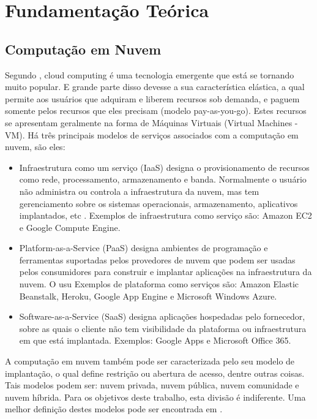\documentclass[twoside,english,brazilian]{UNISINOSmonografia}
\begin{document}

%
%
\chapter{Fundamentação Teórica}

\section{Computação em Nuvem}
Segundo \cite{Lorido-botr2012}, cloud computing é uma tecnologia emergente que está se tornando muito popular. E grande parte disso devesse a sua característica elástica, a qual permite aos usuários que adquiram e liberem recursos sob demanda, e paguem somente pelos recursos que eles precisam (modelo pay-as-you-go). Estes recursos se apresentam geralmente na forma de Máquinas Virtuais (Virtual Machines - VM). Há três principais modelos de serviços associados com a computação em nuvem, são eles:

\begin{itemize}
	\item Infraestrutura como um serviço (IaaS) designa o provisionamento de recursos como rede, processamento, armazenamento e banda. Normalmente o usuário não administra ou controla a infraestrutura da nuvem, mas tem gerenciamento sobre os sistemas operacionais, armazenamento, aplicativos implantados, etc . Exemplos de infraestrutura como serviço são: Amazon EC2 e Google Compute Engine.
	\item Platform-as-a-Service (PaaS) designa ambientes de programação e ferramentas suportadas pelos provedores de nuvem que podem ser usadas pelos consumidores para construir e implantar aplicações na infraestrutura da nuvem. O usu Exemplos de plataforma como serviços são: Amazon Elastic Beanstalk, Heroku, Google App Engine e Microsoft Windows Azure.
	\item Software-as-a-Service (SaaS) designa aplicações hospedadas pelo fornecedor, sobre as quais o cliente não tem visibilidade da plataforma ou infraestrutura em que está implantada. Exemplos: Google Apps e Microsoft Office 365.
\end{itemize}

A computação em nuvem também pode ser caracterizada pelo seu modelo de implantação, o qual define restrição ou abertura de acesso, dentre outras coisas. Tais modelos podem ser: nuvem privada, nuvem pública, nuvem comunidade e nuvem híbrida. Para os objetivos deste trabalho, esta divisão é indiferente. Uma melhor definição destes modelos pode ser encontrada em \citep{coutinho}.
\end{document}
